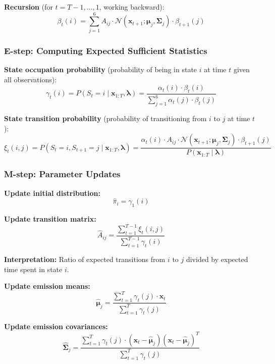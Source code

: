 \documentclass[11pt,a4paper]{article}
\newcommand{\bx}{\mathbf{x}}
\newcommand{\bmu}{\boldsymbol{\mu}}
\newcommand{\bSigma}{\boldsymbol{\Sigma}}
\newcommand{\blambda}{\boldsymbol{\lambda}}
\begin{document}
\textbf{Recursion} (for $t = T-1, \ldots, 1$, working backward):
\begin{equation}
\beta_t(i) = \sum_{j=1}^{6} A_{ij} \cdot \mathcal{N}(\bx_{t+1}; \bmu_j, \bSigma_j) \cdot \beta_{t+1}(j)
\end{equation}

\subsubsection{E-step: Computing Expected Sufficient Statistics}

\textbf{State occupation probability} (probability of being in state $i$ at time $t$ given all observations):
\begin{equation}
\gamma_t(i) = P(S_t = i \mid \bx_{1:T}, \blambda) = \frac{\alpha_t(i) \cdot \beta_t(i)}{\sum_{j=1}^{6} \alpha_t(j) \cdot \beta_t(j)}
\end{equation}

\textbf{State transition probability} (probability of transitioning from $i$ to $j$ at time $t$):
\begin{equation}
\xi_t(i,j) = P(S_t = i, S_{t+1} = j \mid \bx_{1:T}, \blambda) = \frac{\alpha_t(i) \cdot A_{ij} \cdot \mathcal{N}(\bx_{t+1}; \bmu_j, \bSigma_j) \cdot \beta_{t+1}(j)}{P(\bx_{1:T} \mid \blambda)}
\end{equation}

\subsubsection{M-step: Parameter Updates}

\textbf{Update initial distribution:}
\begin{equation}
\hat{\pi}_i = \gamma_1(i)
\end{equation}

\textbf{Update transition matrix:}
\begin{equation}
\hat{A}_{ij} = \frac{\sum_{t=1}^{T-1} \xi_t(i,j)}{\sum_{t=1}^{T-1} \gamma_t(i)}
\end{equation}

\textbf{Interpretation:} Ratio of expected transitions from $i$ to $j$ divided by expected time spent in state $i$.

\textbf{Update emission means:}
\begin{equation}
\hat{\bmu}_j = \frac{\sum_{t=1}^{T} \gamma_t(j) \cdot \bx_t}{\sum_{t=1}^{T} \gamma_t(j)}
\end{equation}

\textbf{Update emission covariances:}
\begin{equation}
\hat{\bSigma}_j = \frac{\sum_{t=1}^{T} \gamma_t(j) \cdot (\bx_t - \hat{\bmu}_j)(\bx_t - \hat{\bmu}_j)^T}{\sum_{t=1}^{T} \gamma_t(j)}
\end{equation}
\end{document}
